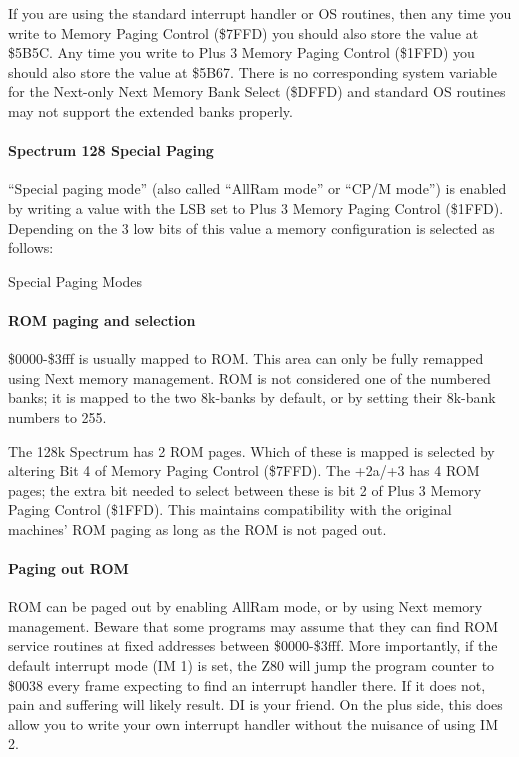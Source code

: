 If you are using the standard interrupt handler or OS routines, then
any time you write to Memory Paging Control (\$7FFD) you should also
store the value at \$5B5C. Any time you write to Plus 3 Memory Paging
Control (\$1FFD) you should also store the value at \$5B67. There is
no corresponding system variable for the Next-only Next Memory Bank
Select (\$DFFD) and standard OS routines may not support the extended
banks properly.

\paragraph{Spectrum 128 Special Paging}

``Special paging mode'' (also called ``AllRam mode'' or ``CP/M mode'')
is enabled by writing a value with the LSB set to Plus 3 Memory Paging
Control (\$1FFD). Depending on the 3 low bits of this value a memory
configuration is selected as follows:

\begin{table}[h]\centering
  \caption{Special Paging Modes}
\end{table}

\paragraph{ROM paging and selection}

\$0000-\$3fff is usually mapped to ROM. This area can only be fully
remapped using Next memory management. ROM is not considered one of
the numbered banks; it is mapped to the two 8k-banks by default, or by
setting their 8k-bank numbers to 255.

The 128k Spectrum has 2 ROM pages. Which of these is mapped is
selected by altering Bit 4 of Memory Paging Control (\$7FFD). The
+2a/+3 has 4 ROM pages; the extra bit needed to select between these
is bit 2 of Plus 3 Memory Paging Control (\$1FFD). This maintains
compatibility with the original machines' ROM paging as long as the
ROM is not paged out.

\paragraph{Paging out ROM}

ROM can be paged out by enabling AllRam mode, or by using Next memory
management. Beware that some programs may assume that they can find
ROM service routines at fixed addresses between \$0000-\$3fff. More
importantly, if the default interrupt mode (IM 1) is set, the Z80 will
jump the program counter to \$0038 every frame expecting to find an
interrupt handler there. If it does not, pain and suffering will
likely result. DI is your friend. On the plus side, this does allow
you to write your own interrupt handler without the nuisance of using
IM 2.

